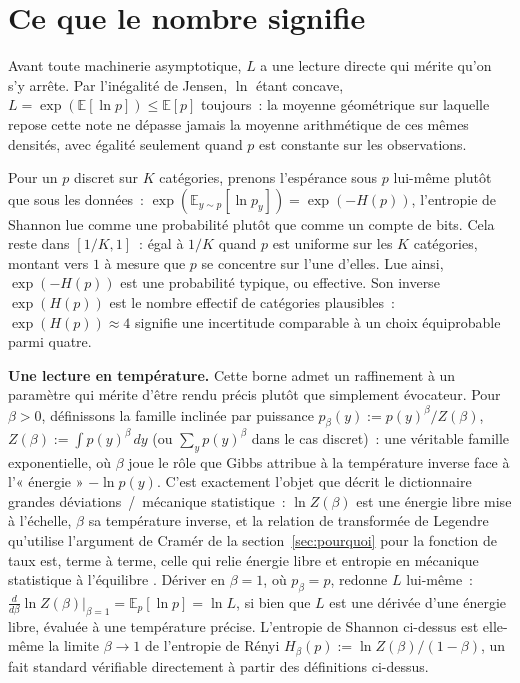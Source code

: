 \documentclass[11pt]{article}
\begin{document}
\section{Ce que le nombre signifie}
\label{sec:sens}

Avant toute machinerie asymptotique, $L$ a une lecture directe qui
mérite qu'on s'y arrête. Par l'inégalité de Jensen, $\ln$ étant
concave, $L = \exp(\mathbb E[\ln p]) \le \mathbb E[p]$ toujours~: la
moyenne géométrique sur laquelle repose cette note ne dépasse jamais
la moyenne arithmétique de ces mêmes densités, avec égalité seulement
quand $p$ est constante sur les observations.

Pour un $p$ discret sur $K$ catégories, prenons l'espérance sous $p$
lui-même plutôt que sous les données~: $\exp(\mathbb E_{y \sim p}[\ln
p_y]) = \exp(-H(p))$, l'entropie de Shannon \citep{mackay2003information}
lue comme une probabilité plutôt que comme un compte de bits. Cela
reste dans $[1/K, 1]$~: égal à $1/K$ quand $p$ est uniforme sur les
$K$ catégories, montant vers $1$ à mesure que $p$ se concentre sur
l'une d'elles. Lue ainsi, $\exp(-H(p))$ est une probabilité typique, ou
effective. Son inverse $\exp(H(p))$ est le nombre effectif de
catégories plausibles~: $\exp(H(p)) \approx 4$ signifie une incertitude
comparable à un choix équiprobable parmi quatre.

\textbf{Une lecture en température.} Cette borne admet un raffinement à
un paramètre qui mérite d'être rendu précis plutôt que simplement
évocateur. Pour $\beta > 0$, définissons la famille inclinée par
puissance $p_\beta(y) := p(y)^\beta / Z(\beta)$, $Z(\beta) := \int
p(y)^\beta\,dy$ (ou $\sum_y p(y)^\beta$ dans le cas discret)~: une
véritable famille exponentielle, où $\beta$ joue le rôle que Gibbs
attribue à la température inverse face à l'« énergie » $-\ln p(y)$.
C'est exactement l'objet que décrit le dictionnaire grandes
déviations~/~mécanique statistique~: $\ln Z(\beta)$ est une énergie
libre mise à l'échelle, $\beta$ sa température inverse, et la relation
de transformée de Legendre qu'utilise l'argument de Cram\'er de la
section~\ref{sec:pourquoi} pour la fonction de taux est, terme à terme,
celle qui relie énergie libre et entropie en mécanique statistique à
l'équilibre \citep{touchette2009}. Dériver en $\beta=1$, où $p_\beta =
p$, redonne $L$ lui-même~: $\frac{d}{d\beta} \ln Z(\beta)\big|_{\beta=1}
= \mathbb E_p[\ln p] = \ln L$, si bien que $L$ est une dérivée d'une
énergie libre, évaluée à une température précise. L'entropie de Shannon
ci-dessus est elle-même la limite $\beta \to 1$ de l'entropie de
R\'enyi $H_\beta(p) := \ln Z(\beta)/(1-\beta)$, un fait standard
vérifiable directement à partir des définitions ci-dessus.
\end{document}
